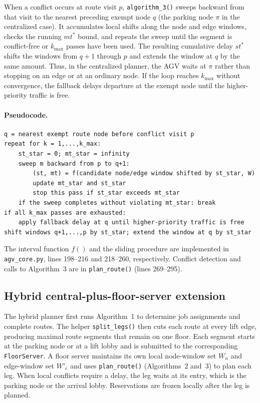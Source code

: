 \documentclass[11pt]{article}
\begin{document}
When a conflict occurs at route visit $p$, \texttt{algorithm\_3()} sweeps
backward from that visit to the nearest preceding exempt node $q$ (the
parking node $\pi$ in the centralized case). It accumulates local shifts
along the node and edge windows, checks the running $mt^*$ bound, and repeats
the sweep until the segment is conflict-free or $k_{\max}$ passes have been
used. The resulting cumulative delay $st^*$ shifts the windows from $q+1$
through $p$ and extends the window at $q$ by the same amount. Thus, in the
centralized planner, the AGV waits at $\pi$ rather than stopping on an edge
or at an ordinary node. If the loop reaches $k_{\max}$ without convergence,
the fallback delays departure at the exempt node until the higher-priority
traffic is free.

\paragraph{Pseudocode.}
\begin{verbatim}
q = nearest exempt route node before conflict visit p
repeat for k = 1,...,k_max:
    st_star = 0; mt_star = infinity
    sweep m backward from p to q+1:
        (st, mt) = f(candidate node/edge window shifted by st_star, W)
        update mt_star and st_star
        stop this pass if st_star exceeds mt_star
    if the sweep completes without violating mt_star: break
if all k_max passes are exhausted:
    apply fallback delay at q until higher-priority traffic is free
shift windows q+1,...,p by st_star; extend the window at q by st_star
\end{verbatim}

The interval function $f()$ and the sliding procedure are implemented in
\texttt{agv\_core.py}, lines 198--216 and 218--260, respectively. Conflict
detection and calls to Algorithm~3 are in \texttt{plan\_route()} (lines
269--295).

\subsection{Hybrid central-plus-floor-server extension}

The hybrid planner first runs Algorithm~1 to determine job assignments and
complete routes. The helper \texttt{split\_legs()} then cuts each route at
every lift edge, producing maximal route segments that remain on one floor.
Each segment starts at the parking node or at a lift lobby and is submitted
to the corresponding \texttt{FloorServer}. A floor server maintains its own
local node-window set $W_n$ and edge-window set $W'_e$ and uses
\texttt{plan\_route()} (Algorithms~2 and~3) to plan each leg. When local
conflicts require a delay, the leg waits at its entry, which is the parking
node or the arrival lobby. Reservations are frozen locally after the leg is
planned.
\end{document}
